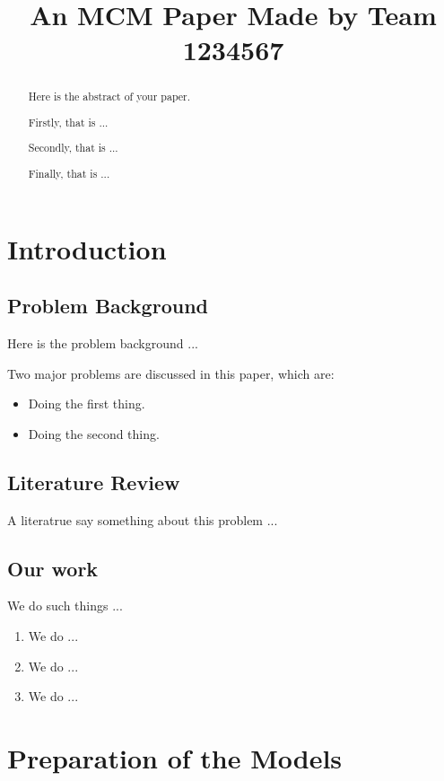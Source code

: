 \documentclass[12pt]{article}  %
\title{An MCM Paper Made by Team 1234567}  %
\begin{document}
\begin{abstract}
    Here is the abstract of your paper.

    Firstly, that is ...

    Secondly, that is ...

    Finally, that is ...


\end{abstract}

\maketitle 



\section{Introduction}
\subsection{Problem Background}
Here is the problem background ...

Two major problems are discussed in this paper, which are:
\begin{itemize}
    \item Doing the first thing.
    \item Doing the second thing.
\end{itemize}

\subsection{Literature Review}
A literatrue\cite{1} say something about this problem ...

\subsection{Our work}
We do such things ...

\begin{enumerate}[\bfseries 1.]
    \item We do ...
    \item We do ...
    \item We do ...
\end{enumerate}

\section{Preparation of the Models}
\end{document}
